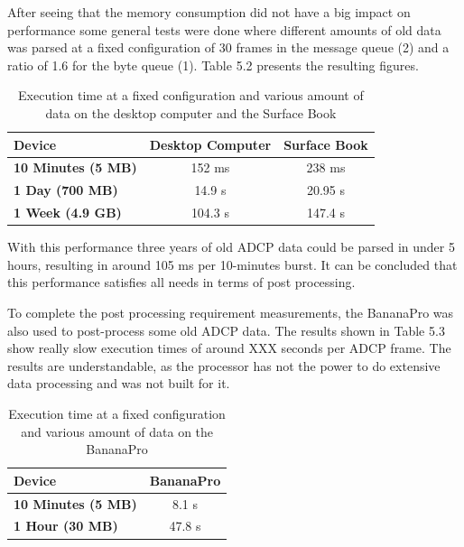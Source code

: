 \pagebreak
After seeing that the memory consumption did not have a big impact on performance some general tests were done where different amounts of old data was parsed at a fixed configuration of 30 frames in the message queue (2) and a ratio of 1.6 for the byte queue (1). Table 5.2 presents the resulting figures. 
\vspace{2em}
\begin{table}[!h]
\centering
	\begin{tabular}{|l|c|c|}
	  \hline
	  	\textbf{Device} & \textbf{Desktop Computer} & \textbf{Surface Book}\\ \hline
	  	\textbf{10 Minutes (5 MB)} & 152 ms & 238 ms\\
	  	\textbf{1 Day (700 MB)} & 14.9 s & 20.95 s\\
	  	\textbf{1 Week (4.9 GB)} & 104.3 s & 147.4 s\\
	  \hline
	\end{tabular}
	\caption{Execution time at a fixed configuration and various amount of data on the desktop computer and the Surface Book}
\end{table}
\vspace{1em}

With this performance three years of old ADCP data could be parsed in under 5 hours, resulting in around 105 ms per 10-minutes burst. It can be concluded that this performance satisfies all needs in terms of post processing.

To complete the post processing requirement measurements, the BananaPro was also used to post-process some old ADCP data. The results shown in Table 5.3 show really slow execution times of around XXX seconds per ADCP frame. The results are understandable, as the processor has not the power to do extensive data processing and was not built for it.
\vspace{2em}
\begin{table}[!h]
\centering
	\begin{tabular}{|l|c|}
	  \hline
	  	\textbf{Device} & \textbf{BananaPro}\\ \hline
	  	\textbf{10 Minutes (5 MB)} & 8.1 s \\
	  	\textbf{1 Hour (30 MB)} & 47.8 s \\
	  \hline
	\end{tabular}
	\caption{Execution time at a fixed configuration and various amount of data on the BananaPro}
\end{table}
\vspace{1em}

